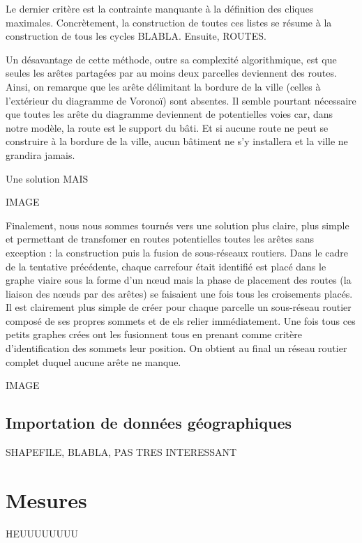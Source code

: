 \documentclass[10pt]{article}
\begin{document}
Le dernier critère est la contrainte manquante à la définition des
cliques maximales. Concrètement, la construction de toutes ces listes
se résume à la construction de tous les cycles BLABLA. Ensuite,
ROUTES.

Un désavantage de cette méthode, outre sa complexité algorithmique,
est que seules les arêtes partagées par au moins deux parcelles
deviennent des routes. Ainsi, on remarque que les arête délimitant la
bordure de la ville (celles à l'extérieur du diagramme de Voronoï)
sont absentes. Il semble pourtant nécessaire que toutes les arête du
diagramme deviennent de potentielles voies car, dans notre modèle, la
route est le support du bâti. Et si aucune route ne peut se construire
à la bordure de la ville, aucun bâtiment ne s'y installera et la ville
ne grandira jamais.

Une solution MAIS

IMAGE

Finalement, nous nous sommes tournés vers une solution plus claire,
plus simple et permettant de transfomer en routes potentielles toutes
les arêtes sans exception : la construction puis la fusion de
sous-réseaux routiers. Dans le cadre de la tentative précédente,
chaque carrefour était identifié est placé dans le graphe viaire sous
la forme d'un n\oe ud mais la phase de placement des routes (la
liaison des n\oe uds par des arêtes) se faisaient une fois tous les
croisements placés. Il est clairement plus simple de créer pour chaque
parcelle un sous-réseau routier composé de ses propres sommets et de
els relier immédiatement. Une fois tous ces petits graphes crées ont
les fusionnent tous en prenant comme critère d'identification des
sommets leur position. On obtient au final un réseau routier complet
duquel aucune arête ne manque.

IMAGE

\subsection{Importation de données géographiques}

SHAPEFILE, BLABLA, PAS TRES INTERESSANT

\section{Mesures}

HEUUUUUUUU

\printbibliography
\end{document}
